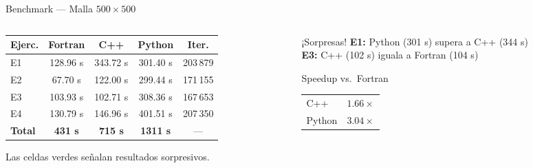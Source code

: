 \documentclass[aspectratio=169, 11pt]{beamer}
\begin{document}
\begin{frame}{Benchmark — Malla $500\times500$}
  \begin{columns}[T]
    \begin{column}{0.60\textwidth}
      \begin{center}
      \small
      \begin{tabular}{lcccc}
        \toprule
        \textbf{Ejerc.} & \textbf{Fortran} & \textbf{C++} & \textbf{Python} & \textbf{Iter.} \\
        \midrule
        E1 & 128.96 s & 343.72 s & \cellcolor{verdek!20}301.40 s & 203\,879 \\
        E2 &  67.70 s & 122.00 s & 299.44 s & 171\,155 \\
        E3 & 103.93 s & \cellcolor{verdek!20}102.71 s & 308.36 s & 167\,653 \\
        E4 & 130.79 s & 146.96 s & 401.51 s & 207\,350 \\
        \midrule
        \rowcolor{azulfc!12}
        \textbf{Total} & \textbf{431 s} & \textbf{715 s} & \textbf{1311 s} & — \\
        \bottomrule
      \end{tabular}
      \end{center}
      \vspace{0.2cm}
      {\small\color{verdek!70!black} Las celdas verdes señalan resultados sorpresivos.}
    \end{column}
    \begin{column}{0.36\textwidth}
      \begin{alertblock}{¡Sorpresas!}
        \textbf{E1:} Python (301 s) supera a C++ (344 s)\\[0.2cm]
        \textbf{E3:} C++ (102 s) iguala a Fortran (104 s)
      \end{alertblock}
      \vspace{0.2cm}
      \begin{block}{Speedup vs.\ Fortran}
        \begin{tabular}{lc}
          \toprule
          C++    & $1.66\times$ \\
          Python & $3.04\times$ \\
          \bottomrule
        \end{tabular}
      \end{block}
    \end{column}
  \end{columns}
\end{frame}

\end{document}
